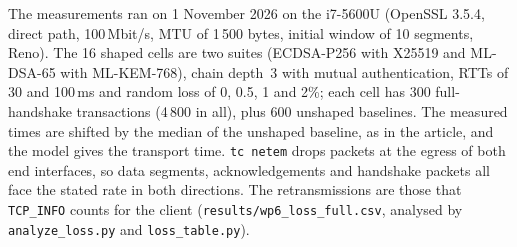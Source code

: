\documentclass[preprint,12pt]{elsarticle}
\newcommand{\ms}{\,ms\xspace}
\newcommand{\Mbits}{\,Mbit/s\xspace}
\begin{document}
The measurements ran on 1 November 2026 on the i7-5600U (OpenSSL 3.5.4, direct path, 100\Mbits, MTU of 1\,500 bytes, initial window of 10 segments, Reno). The 16 shaped cells are two suites (ECDSA-P256 with X25519 and ML-DSA-65 with ML-KEM-768), chain depth~3 with mutual authentication, RTTs of 30 and 100\ms and random loss of 0, 0.5, 1 and 2\%; each cell has 300 full-handshake transactions (4\,800 in all), plus 600 unshaped baselines. The measured times are shifted by the median of the unshaped baseline, as in the article, and the model gives the transport time. \texttt{tc netem} drops packets at the egress of both end interfaces, so data segments, acknowledgements and handshake packets all face the stated rate in both directions. The retransmissions are those that \texttt{TCP\_INFO} counts for the client (\texttt{results/wp6\_loss\_full.csv}, analysed by \texttt{analyze\_loss.py} and \texttt{loss\_table.py}).
\end{document}
